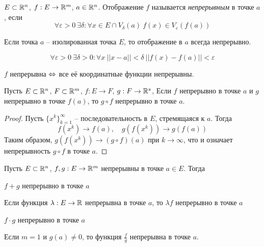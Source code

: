 
    \begin{Def}
        $E \subset \mathbb{R}^n$, $f : E \to \mathbb{R}^m$, $a \in \mathbb{R}^n$. Отображение $f$ называется \textit{непрерывным} в точке $a$, если 
        \[\forall \varepsilon > 0 \ \exists \delta : \forall x \in E \cap V_\delta(a) \ f(x) \in V_\varepsilon (f(a))\]
    \end{Def}

    \begin{Rem}
        Если точка $a$ -- изолированная точка $E$, то отображение в $a$ всегда непрерывно.
    \end{Rem}

    \begin{Rem}
        \[\forall \varepsilon > 0 \ \exists \delta > 0 : \forall x \ ||x - a|| < \delta \ ||f(x) - f(a)|| < \varepsilon\]
    \end{Rem}

    \begin{Rem}
        $f$ непрерывна $\Leftrightarrow$ все её координатные функции непрерывны.
    \end{Rem}

    \begin{Thm}
        Пусть $E \subset \mathbb{R}^n$, $F \subset \mathbb{R}^m$, $f : E \to F$, $g : F \to \mathbb{R}^s$, 
        Если $f$ непрерывно в точке $a$ и $g$ непрерывно в точке $f(a)$, то $g \circ f$ непрерывно в точке $a$.
    \end{Thm}

    \begin{proof}
        Пусть $\{x^k\}_{k = 1}^\infty$ -- последовательность в $E$, стремящаяся к $a$. Тогда
        \[f(x^k) \to f(a), \quad g(f(x^k)) \to g(f(a))\]
        Таким образом, $g(f(x^k)) \to (g \circ f)(a)$ при $k \to \infty$, что и означает непрерывность $g \circ f$ в точке $a$. 
    \end{proof}

    \begin{Thm}
        Пусть $E \subset \mathbb{R}^n$, $f, g : E \to \mathbb{R}^m$ непрерывны в точке $a \in E$. Тогда 
        \begin{MyList}
            \item $f + g$ непрерывно в точке $a$
            \item Если функция $\lambda : E \to \mathbb{R}$ непрерывна в точке $a$, то $\lambda f$ непрерывно в точке $a$
            \item $f \cdot g$ непрерывно в точке $a$
            \item Если $m = 1$ и $g(a) \neq 0$, то функция $\frac{f}{g}$ непрерывна в точке $a$.
        \end{MyList}
    \end{Thm}
    
